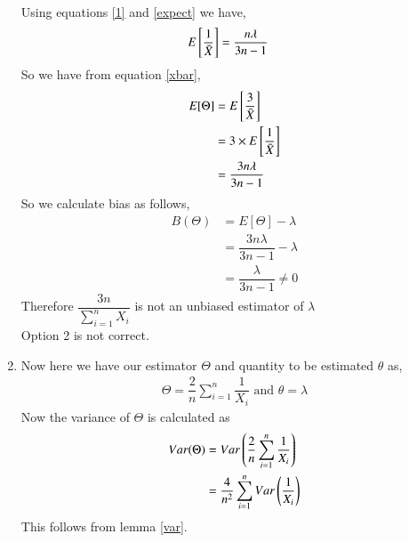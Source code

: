 \documentclass[journal,12pt,twocolumn]{IEEEtran}
\theoremstyle{definition}
\begin{document}
\begin{enumerate}
\begin{align}
    \label{1}
\end{align}
Using equations \eqref{1} and \eqref{expect} we have,
\begin{align}
    E \left[  \dfrac{1}{\Bar{X}}  \right] &= \dfrac{n\lambda}{3n-1}
\end{align}
So we have from equation \eqref{xbar},
\begin{align}
    E[\Theta] &= E\left[  \dfrac{3}{\Bar{X}}  \right]  \\
    &= 3\times  E \left[  \dfrac{1}{\Bar{X}}  \right] \\
    &= \dfrac{3n\lambda}{3n-1}
\end{align}
So we calculate bias as follows,
\begin{align}
    B(\Theta) & = E[\Theta] - \lambda \\
    &= \dfrac{3n\lambda}{3n-1} - \lambda \\
    &= \dfrac{\lambda}{3n-1} \neq 0
\end{align}
Therefore $ \dfrac{3n}{\sum_{i=1}^{n} X_i } $ is not an unbiased estimator of $ \lambda$ \\
Option 2 is not correct. \\
\item
 Now here we have our estimator $ \Theta$ and quantity to be estimated $ \theta $ as,
 \begin{align}
     \Theta = \dfrac{2}{n} \sum_{i=1}^{n} \dfrac{1}{X_i} \text{  and  }
     \theta = \lambda
 \end{align}
Now the variance of $ \Theta$ is calculated as
\begin{align}
    Var(\Theta) &= Var\left(\dfrac{2}{n} \sum_{i=1}^{n} \dfrac{1}{X_i} \right) \\
    & = \dfrac{4}{n^2} \sum_{i=1}^{n} Var\left(\dfrac{1}{X_i}\right) 
    \label{eq3}
\end{align}
This follows from lemma \ref{var}.


\end{enumerate}
\end{document}
